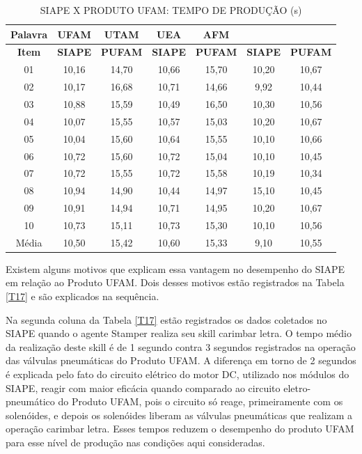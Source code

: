 \documentclass[10pt,letterpaper,twocolumn]{IEEEtran}
\begin{document}
\begin{table}
	\small
	\centering
	\caption{SIAPE X PRODUTO UFAM: TEMPO DE PRODUÇÃO (s)}
	\begin{tabular}{ c|c c| c c | c c }
		\hline
		\textbf{ Palavra} & \multicolumn{1}{c}{\textbf{UFAM}}  & \multicolumn{1}{c}{\textbf{UTAM}} & \textbf{ UEA} & \textbf{ AFM} \\ \hline
		\textbf{Item} & \textbf{SIAPE} & \textbf{PUFAM} & \textbf{ SIAPE} & \textbf{ PUFAM} & \textbf{ SIAPE} & \textbf{ PUFAM}\\ 
		\hline
		
		01 &10,16 &  14,70  & 10,66 & 15,70 & 10,20 &  10,67 \\ \hline
		02 & 10,17 &  16,68  & 10,71 & 14,66 & 9,92  &  10,44 \\ \hline
		03 & 10,88 &  15,59  & 10,49 & 16,50 & 10,30 &  10,56	\\ \hline
		04 & 10,07 &  15,55  & 10,57 & 15,03 & 10,20 &  10,67	\\ \hline
		05 & 10,04 &  15,60  & 10,64 & 15,55 & 10,10 &  10,66	\\ \hline
		06 & 10,72 &  15,60  & 10,72 & 15,04 & 10,10 &  10,45	\\ \hline
		07 & 10,72 &  15,55  & 10,72 & 15,58 & 10,19 &  10,34	\\ \hline
		08 & 10,94 &  14,90  & 10,44 & 14,97 & 15,10 &  10,45	\\ \hline
		09 & 10,91 &  14,94  & 10,71 & 14,95 & 10,20 &  10,67 \\ \hline
		10 & 10,73 &  15,11  & 10,73 & 15,30 & 10,10 &  10,56	\\ \hline
		\hline
		Média & 10,50 &  15,42 	& 10,60 & 15,33 & 9,10 &  10,55	\\ \hline
	\end{tabular}												
	\label{T16}\par
\end{table}

Existem alguns motivos que explicam essa vantagem no desempenho do SIAPE em relação ao Produto UFAM. Dois desses motivos estão registrados na Tabela \ref{T17} e são explicados na sequência. \par 

Na segunda coluna da Tabela \ref{T17} estão registrados os dados coletados no SIAPE quando o agente Stamper realiza seu skill carimbar letra. O tempo médio da realização deste skill é de 1 segundo contra 3 segundos registrados na operação das válvulas pneumáticas do Produto UFAM. A diferença em torno de 2 segundos é explicada pelo fato do circuito elétrico do motor DC, utilizado nos módulos do SIAPE, reagir com maior eficácia  quando comparado ao circuito eletro-pneumático do Produto UFAM, pois o circuito só reage, primeiramente com os solenóides, e depois os solenóides liberam as válvulas pneumáticas que realizam a operação carimbar letra. Esses tempos reduzem o desempenho do produto UFAM para esse nível de produção nas condições aqui consideradas.\par
\end{document}
